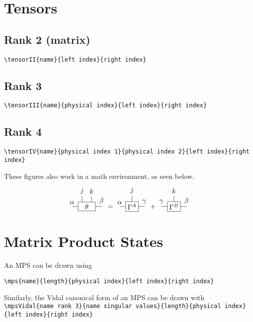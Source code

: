 \documentclass{article}
\begin{document}
\section*{Tensors}
\subsection*{Rank 2 (matrix)}
\lstinline[style=latexcode]|\tensorII{name}{left index}{right index}|
\begin{figure}[H]
\centering
{}
\end{figure}


\subsection*{Rank 3}
\lstinline[style=latexcode]|\tensorIII{name}{physical index}{left index}{right index}|
\begin{figure}[H]
\centering
{}
\end{figure}

\subsection*{Rank 4}
\lstinline[style=latexcode]|\tensorIV{name}{physical index 1}{physical index 2}{left index}{right index}|
\begin{figure}[H]
\centering
{}
\end{figure}

These figures also work in a math environment, as seen below.
\begin{align}
\tensorIV{\theta}{j}{k}{\alpha}{\beta} =
\tensorIII{\Gamma^A}{j}{\alpha}{\gamma} +
\tensorIII{\Gamma^B}{k}{\gamma}{\beta}
\end{align}


\section*{Matrix Product States}
An MPS can be drawn using  

\lstinline[style=latexcode]|\mps{name}{length}{physical index}{left index}{right index}|

\begin{figure}[H]
\centering
{} 
\end{figure}

Similarly, the Vidal canonical form of an MPS can be drawn with
\lstinline[style=latexcode]|\mpsVidal{name rank 3}{name singular values}{length}{physical index}{left index}{right index}|

\begin{figure}[H]
\centering
{} 
\end{figure}
\end{document}
